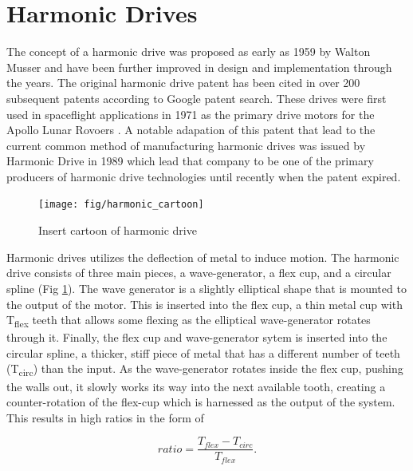 \section{Harmonic Drives} \label{intro:harmonic}

The concept of a harmonic drive was proposed as early as 1959 by Walton Musser \cite{ref:harmonic_original} and have been further improved in design and implementation through the years. The original harmonic drive patent has been cited in over 200 subsequent patents according to Google patent search. These drives were first used in spaceflight applications in 1971 as the primary drive motors for the Apollo Lunar Rovoers \cite{ref:harmonic_apollo}. A notable adapation of this patent that lead to the current common method of manufacturing harmonic drives was issued by Harmonic Drive in 1989 \cite{ref:harmonic_drive_co} which lead that company to be one of the primary producers of harmonic drive technologies until recently when the patent expired. 

\begin{figure}[!b]
   \centering
   \texttt{[image: fig/harmonic\_cartoon]}
   \caption{Insert cartoon of harmonic drive}
   \label{fig:harmonic_cartoon}
\end{figure}

Harmonic drives utilizes the deflection of metal to induce motion. The harmonic drive consists of three main pieces, a wave-generator, a flex cup, and a circular spline (Fig \ref{fig:harmonic_cartoon}). The wave generator is a slightly elliptical shape that is mounted to the output of the motor. This is inserted into the flex cup, a thin metal cup with T\textsubscript{flex} teeth that allows some flexing as the elliptical wave-generator rotates through it. Finally, the flex cup and wave-generator sytem is inserted into the circular spline, a thicker, stiff piece of metal that has a different number of teeth (T\textsubscript{circ}) than the input. As the wave-generator rotates inside the flex cup, pushing the walls out, it slowly works its way into the next available tooth, creating a counter-rotation of the flex-cup which is harnessed as the output of the system. This results in high ratios in the form of 

\begin{equation} \label{eq:0}
ratio = \frac{T_{flex} - T_{circ}} {T_{flex}}.
\end{equation}

